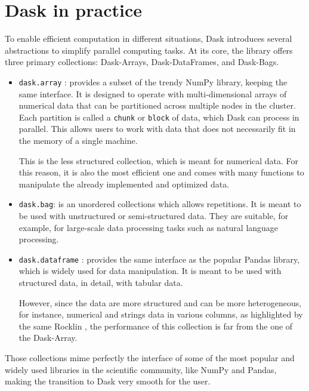 \section{Dask in practice}\label{sec:daskcloud}

To enable efficient computation in different situations, Dask introduces several
abstractions to simplify parallel computing tasks.
At its core, the library offers three primary collections: Dask-Arrays,
Dask-DataFrames, and Dask-Bags.

\begin{itemize}
  \itemsep0em
  \item \texttt{dask.array} \cite{daskdoc-array}: provides a subset of the
    trendy NumPy library, keeping the same interface. It is designed to operate
    with multi-dimensional arrays of numerical data that can be partitioned
    across multiple nodes in the cluster. Each partition is called a
    \texttt{chunk} or \texttt{block} of data, which Dask can process in parallel.
    This allows users to work with data that does not necessarily fit in the memory
    of a single machine.

    This is the less structured collection, which is meant for numerical data.
    For this reason, it is also the most efficient one and comes with many
    functions to manipulate the already implemented and optimized data.
  \item \texttt{dask.bag}: is an unordered collections which allows repetitions.
    It is meant to be used with unstructured or semi-structured data. They are
    suitable, for example, for large-scale data processing tasks such as natural
    language processing.
  \item \texttt{dask.dataframe} \cite{daskdoc-dataframe}: provides the same
    interface as the popular Pandas library, which is widely used for data
    manipulation. It is meant to be used with structured data, in detail, with
    tabular data.

    However, since the data are more structured and can be more heterogeneous,
    for instance, numerical and strings data in various columns, as highlighted
    by the same Rocklin \cite{dask2015}, the performance of this collection is
    far from the one of the Dask-Array.
\end{itemize}

Those collections mime perfectly the interface of some of the most popular and
widely used libraries in the scientific community, like NumPy and Pandas, making
the transition to Dask very smooth for the user.


